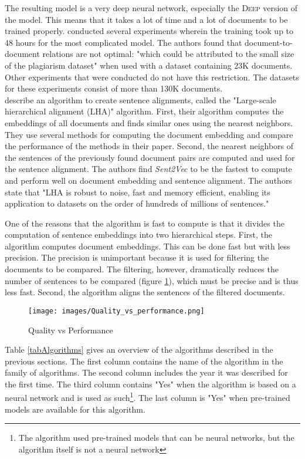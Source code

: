 The resulting model is a very deep neural network, especially the \textsc{Deep} version of the model. This means that it takes a lot of time and a lot of documents to be trained properly. \citet{zhou2020multilevel} conducted several experiments wherein the training took up to 48 hours for the most complicated model. The authors found that document-to-document relations are not optimal: "which could be attributed to the small size of the plagiarism dataset" when used with a dataset containing 23K documents. Other experiments that were conducted do not have this restriction. The datasets for these experiments consist of more than 130K documents. \\

\citet{nikolov2018large} describe an algorithm to create sentence alignments, called the "Large-scale hierarchical alignment (LHA)" algorithm. First, their algorithm computes the embeddings of all documents and finds similar ones using the nearest neighbors. They use several methods for computing the document embedding and compare the performance of the methods in their paper. Second, the nearest neighbors of the sentences of the previously found document pairs 
 are computed and used for the sentence alignment. The authors find \textit{Sent2Vec} \citep{pagliardini2017unsupervised} to be the fastest to compute and perform well on document embedding and sentence alignment. The authors state that "LHA is robust to noise, fast and memory efficient, enabling its application to datasets on the order of hundreds of millions of sentences." 

One of the reasons that the algorithm is fast to compute is that it divides the computation of sentence embeddings into two hierarchical steps. First, the algorithm computes document embeddings. This can be done fast but with less precision. The precision is unimportant because it is used for filtering the documents to be compared. The filtering, however, dramatically reduces the number of sentences to be compared (figure \ref{imgQP}), which must be precise and is thus less fast. Second, the algorithm aligns the sentences of the filtered documents.\\

\begin{figure}[hbt]
\centering
\captionsetup{justification=centering}
  \texttt{[image: images/Quality\_vs\_performance.png]}
  \caption{Quality vs Performance}
  \label{imgQP}
\end{figure}


Table \ref{tabAlgorithms} gives an overview of the algorithms described in the previous sections. The first column contains the name of the algorithm in the family of algorithms. The second column includes the year it was described for the first time. The third column contains "Yes" when the algorithm is based on a neural network and is used as such\footnote{The algorithm used pre-trained models that can be neural networks, but the algorithm itself is not a neural network}. The last column is "Yes" when pre-trained models are available for this algorithm.



